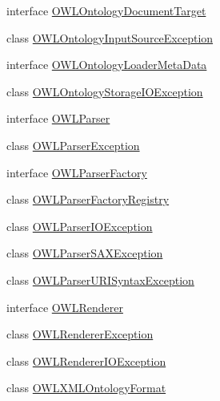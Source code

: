 \begin{DoxyCompactItemize}
\item 
interface \hyperlink{interfaceorg_1_1semanticweb_1_1owlapi_1_1io_1_1_o_w_l_ontology_document_target}{O\-W\-L\-Ontology\-Document\-Target}
\item 
class \hyperlink{classorg_1_1semanticweb_1_1owlapi_1_1io_1_1_o_w_l_ontology_input_source_exception}{O\-W\-L\-Ontology\-Input\-Source\-Exception}
\item 
interface \hyperlink{interfaceorg_1_1semanticweb_1_1owlapi_1_1io_1_1_o_w_l_ontology_loader_meta_data}{O\-W\-L\-Ontology\-Loader\-Meta\-Data}
\item 
class \hyperlink{classorg_1_1semanticweb_1_1owlapi_1_1io_1_1_o_w_l_ontology_storage_i_o_exception}{O\-W\-L\-Ontology\-Storage\-I\-O\-Exception}
\item 
interface \hyperlink{interfaceorg_1_1semanticweb_1_1owlapi_1_1io_1_1_o_w_l_parser}{O\-W\-L\-Parser}
\item 
class \hyperlink{classorg_1_1semanticweb_1_1owlapi_1_1io_1_1_o_w_l_parser_exception}{O\-W\-L\-Parser\-Exception}
\item 
interface \hyperlink{interfaceorg_1_1semanticweb_1_1owlapi_1_1io_1_1_o_w_l_parser_factory}{O\-W\-L\-Parser\-Factory}
\item 
class \hyperlink{classorg_1_1semanticweb_1_1owlapi_1_1io_1_1_o_w_l_parser_factory_registry}{O\-W\-L\-Parser\-Factory\-Registry}
\item 
class \hyperlink{classorg_1_1semanticweb_1_1owlapi_1_1io_1_1_o_w_l_parser_i_o_exception}{O\-W\-L\-Parser\-I\-O\-Exception}
\item 
class \hyperlink{classorg_1_1semanticweb_1_1owlapi_1_1io_1_1_o_w_l_parser_s_a_x_exception}{O\-W\-L\-Parser\-S\-A\-X\-Exception}
\item 
class \hyperlink{classorg_1_1semanticweb_1_1owlapi_1_1io_1_1_o_w_l_parser_u_r_i_syntax_exception}{O\-W\-L\-Parser\-U\-R\-I\-Syntax\-Exception}
\item 
interface \hyperlink{interfaceorg_1_1semanticweb_1_1owlapi_1_1io_1_1_o_w_l_renderer}{O\-W\-L\-Renderer}
\item 
class \hyperlink{classorg_1_1semanticweb_1_1owlapi_1_1io_1_1_o_w_l_renderer_exception}{O\-W\-L\-Renderer\-Exception}
\item 
class \hyperlink{classorg_1_1semanticweb_1_1owlapi_1_1io_1_1_o_w_l_renderer_i_o_exception}{O\-W\-L\-Renderer\-I\-O\-Exception}
\item 
class \hyperlink{classorg_1_1semanticweb_1_1owlapi_1_1io_1_1_o_w_l_x_m_l_ontology_format}{O\-W\-L\-X\-M\-L\-Ontology\-Format}
\item 

\end{DoxyCompactItemize}
